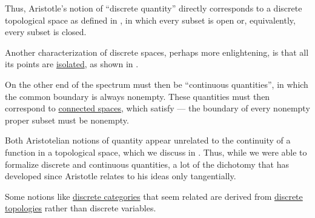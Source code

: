 \begin{concept}
  Thus, Aristotle's notion of \enquote{discrete quantity} directly corresponds to a discrete topological space as defined in , in which every subset is open or, equivalently, every subset is closed.

  Another characterization of discrete spaces, perhaps more enlightening, is that all its points are \hyperref[def:set_cluster_point]{isolated}, as shown in .

  On the other end of the spectrum must then be \enquote{continuous quantities}, in which the common boundary is always nonempty. These quantities must then correspond to \hyperref[def:connected_space]{connected spaces}, which satisfy  --- the boundary of every nonempty proper subset must be nonempty.
\end{concept}
\begin{comments}
  \item Both Aristotelian notions of quantity appear unrelated to the continuity of a function in a topological space, which we discuss in . Thus, while we were able to formalize discrete and continuous quantities, a lot of the dichotomy that has developed since Aristotle relates to his ideas only tangentially.

  \item Some notions like \hyperref[def:discrete_category]{discrete categories} that seem related are derived from \hyperref[def:discrete_topology]{discrete topologies} rather than discrete variables.
\end{comments}

